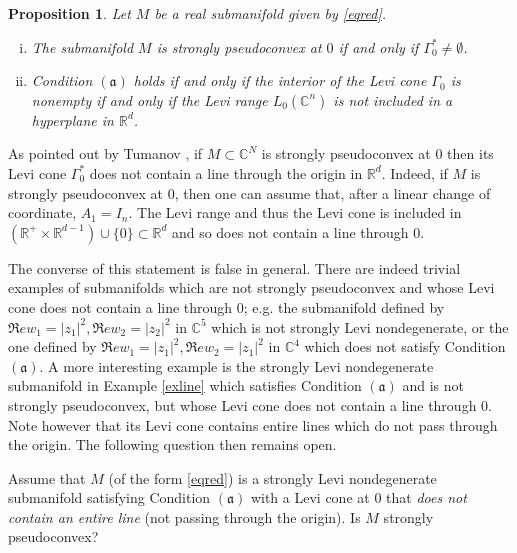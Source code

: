 \documentclass[12pt]{amsart}
\newcommand{\C}{\mathbb C}
\newcommand{\R}{\mathbb R}
\newcommand{\transp}{\,^t}
\newcommand{\aaa}{\mathfrak{(a)}}
\newtheorem{prop}[theo]{Proposition}
\theoremstyle{remark}
\newtheorem{remark}[theo]{Remark}
\theoremstyle{example}
\theoremstyle{definition}
\numberwithin{equation}{section}
\begin{document}
\begin{prop}\label{propcone1}
Let $M$ be a real submanifold given by \eqref{eqred}. 
\begin{enumerate}[i.]
\item The submanifold $M$ is strongly pseudoconvex at $0$ if and only if $\Gamma^*_0\neq \emptyset$.
\item Condition $\aaa$ holds if and only if the interior of the Levi cone $\Gamma_0$ is  nonempty if and only if the Levi range $L_0(\C^n)$ is not included in a hyperplane in $\R^d$. 
\end{enumerate}
\end{prop}





As pointed out by Tumanov \cite{tu,tu2},  if $M \subset \C^N$ is strongly pseudoconvex at $0$ then its Levi cone $\Gamma^*_0$ does not contain a line through the origin in $\R^d$. Indeed, if  $M$ is strongly pseudoconvex at $0$, then one can assume that, after a linear change of coordinate, $A_1=I_n$. The Levi range and thus the Levi 
cone is included in $(\R^+\times \R^{d-1}) \cup \{0\} \subset \R^d$ and so does not contain a line through $0$. 

The converse of this statement is false in general. There are indeed trivial examples of submanifolds which are not strongly pseudoconvex and whose Levi cone does not contain a line through 0; e.g. the submanifold defined by $\Re e w_1=|z_1|^2, \Re e w_2=|z_2|^2$ in $\C^5$ which is  not strongly Levi nondegenerate, or  the one defined by $\Re e w_1=|z_1|^2, 
\Re e w_2=|z_1|^2$ in $\C^4$ which does not satisfy Condition $\aaa$. A more interesting example is the strongly Levi 
nondegenerate submanifold  in Example \ref{exline} which satisfies Condition $\aaa$ and is not strongly pseudoconvex, but whose Levi cone 
does not contain a line through $0$. Note however that its Levi cone contains entire lines which do not pass through the origin. 
The following question then remains open.

\vspace{0.1cm}

  Assume that $M$ (of the form \eqref{eqred}) is a strongly Levi nondegenerate submanifold satisfying Condition $\aaa$ with a Levi cone at $0$ that {\it does not contain an entire line} (not passing through the origin). Is $M$ strongly pseudoconvex?
%
%
%
%
%

%
\end{document}
